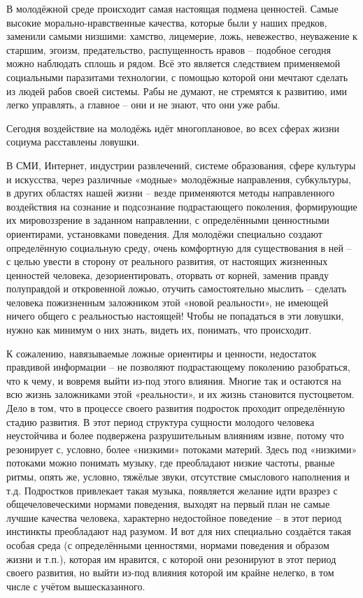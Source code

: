 В молодёжной среде происходит самая настоящая подмена ценностей. Самые высокие
морально-нравственные качества, которые были у наших предков, заменили самыми
низшими: хамство, лицемерие, ложь, невежество, неуважение к старшим, эгоизм,
предательство, распущенность нравов – подобное сегодня можно наблюдать сплошь и
рядом. Всё это является следствием применяемой социальными паразитами
технологии, с помощью которой они мечтают сделать из людей рабов своей системы.
Рабы не думают, не стремятся к развитию, ими легко управлять, а главное – они и
не знают, что они уже рабы.

Сегодня воздействие на молодёжь идёт многоплановое, во всех сферах жизни
социума расставлены ловушки. 

В СМИ, Интернет, индустрии развлечений, системе
образования, сфере культуры и искусства, через различные «модные» молодёжные
направления, субкультуры, в других областях нашей жизни – везде применяются
методы направленного воздействия на сознание и подсознание подрастающего
поколения, формирующие их мировоззрение в заданном направлении, с определёнными
ценностными ориентирами, установками поведения. Для молодёжи специально создают
определённую социальную среду, очень комфортную для существования в ней – с
целью увести в сторону от реального развития, от настоящих жизненных ценностей
человека, дезориентировать, оторвать от корней, заменив правду полуправдой и
откровенной ложью, отучить самостоятельно мыслить – сделать человека
пожизненным заложником этой «новой реальности», не имеющей ничего общего с
реальностью настоящей! Чтобы не попадаться в эти ловушки, нужно как минимум о
них знать, видеть их, понимать, что происходит. 

К сожалению, навязываемые
ложные ориентиры и ценности, недостаток правдивой информации – не позволяют
подрастающему поколению разобраться, что к чему, и вовремя выйти из-под этого
влияния. Многие так и остаются на всю жизнь заложниками этой «реальности», и их
жизнь становится пустоцветом. Дело в том, что в процессе своего развития
подросток проходит определённую стадию развития. В этот период структура
сущности молодого человека неустойчива и более подвержена разрушительным
влияниям извне, потому что резонирует с, условно, более «низкими» потоками
материй. Здесь под «низкими» потоками можно понимать музыку, где преобладают
низкие частоты, рваные ритмы, опять же, условно, тяжёлые звуки, отсутствие
смыслового наполнения и т.д. Подростков привлекает такая музыка, появляется
желание идти вразрез с общечеловеческими нормами поведения, выходят на первый
план не самые лучшие качества человека, характерно недостойное поведение – в
этот период инстинкты преобладают над разумом. И вот для них специально
создаётся такая особая среда (с определёнными ценностями, нормами поведения и
образом жизни и т.п.), которая им нравится, с которой они резонируют в этот
период своего развития, но выйти из-под влияния которой им крайне нелегко, в
том числе с учётом вышесказанного.

